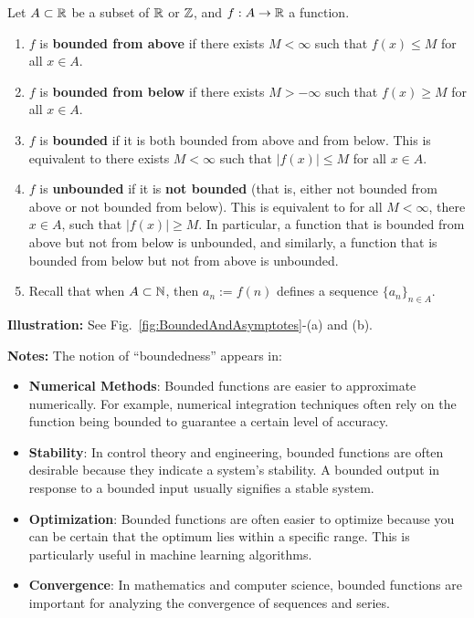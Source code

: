 \begin{tcolorbox}[colback=mylightblue, title = {\bf Bounded Functions}, breakable]
\begin{definition}
\label{def:boundedVersusUnbounded}
Let $A\subset \mathbb R $ be a subset of $\mathbb R$ or $\mathbb Z$, and $f:A \to \mathbb R$ a function. 
\begin{enumerate}
\renewcommand{\labelenumi}{(\alph{enumi})}
\setlength{\itemsep}{.2cm}
    \item $f$ is \textbf{bounded from above} if there exists $M < \infty$ such that $f(x) \le M$ for all $x \in A$.
    \item $f$ is \textbf{bounded from below} if there exists $M >-\infty$ such that $f(x) \ge M$ for all $x \in A$.
    \item $f$ is \textbf{bounded} if it is both bounded from above and from below. This is equivalent to there exists $M <\infty$ such that $|f(x)| \le M$ for all $x \in A$.
    \item $f$ is \textbf{unbounded} if it is \textbf{not bounded} (that is, either not bounded from above or not bounded from below). This is equivalent to for all $M <\infty$, there $x \in A$, such that $|f(x)| \ge M$. In particular, a function that is bounded from above but not from below is unbounded, and similarly, a function that is bounded from below but not from above is unbounded.
    \item Recall that when $A \subset \mathbb N$, then $a_n:=f(n)$ defines a sequence $\{a_n\}_{n \in A}$.
\end{enumerate}
\end{definition}
\bigskip

\textbf{Illustration:} See Fig.~\ref{fig:BoundedAndAsymptotes}-(a) and (b).

\bigskip

\textbf{Notes:} The notion of ``boundedness'' appears in:
\begin{itemize}    
    \item \textbf{Numerical Methods}: Bounded functions are easier to approximate numerically. For example, numerical integration techniques often rely on the function being bounded to guarantee a certain level of accuracy.
           
    \item \textbf{Stability}: In control theory and engineering, bounded functions are often desirable because they indicate a system's stability. A bounded output in response to a bounded input usually signifies a stable system.
        
    \item \textbf{Optimization}: Bounded functions are often easier to optimize because you can be certain that the optimum lies within a specific range. This is particularly useful in machine learning algorithms.
    
    \item \textbf{Convergence}: In mathematics and computer science, bounded functions are important for analyzing the convergence of sequences and series. 

\end{itemize}

\end{tcolorbox}

